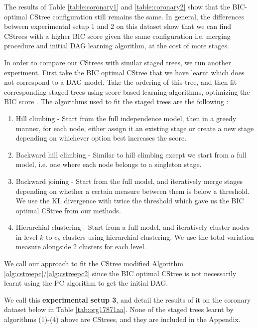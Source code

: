 \documentclass{tufte-book}
\begin{document}
The results of Table \ref{table:coronary1} and \ref{table:coronary2} show that the BIC-optimal CStree configuration still remains the same. In general, the differences between experimental setup 1 and 2 on this dataset show that we can find CStrees with a higher BIC score given the same configuration i.e. merging procedure and initial DAG learning algorithm, at the cost of more stages.




In order to compare our CStrees with similar staged trees, we run another experiment. First take the BIC optimal CStree that we have learnt which does not correspond to a DAG model. Take the ordering of this tree, and then fit corresponding staged trees using score-based learning algorithms, optimizing the BIC score \cite{carli-2020-r-packag}. The algorithms used to fit the staged trees are the following \cite{collazo-2018-chain}:


\begin{enumerate}
\item Hill climbing - Start from the full independence model, then in a greedy manner, for each node, either assign it an existing stage or create a new stage depending on whichever option best increases the score.
\item Backward hill climbing - Similar to hill climbing except we start from a full model, i.e. one where each node belongs to a singleton stage.
\item Backward joining - Start from the full model, and iteratively merge stages depending on whether a certain measure between them is below a threshold. We use the KL divergence with twice the threshold which gave us the BIC optimal CStree from our methods.
\item Hierarchial clustering - Start from a full model, and iteratively cluster nodes in level \(k\) to \(c_k\) clusters using hierarchial clustering. We use the total variation measure alongside 2 clusters for each level.
\end{enumerate}



We call our approach to fit the CStree modified Algorithm \ref{alg:cstreepc}/\ref{alg:cstreepc2} since the BIC optimal CStree is not necessarily learnt using the PC algorithm to get the initial DAG.

We call this \textbf{experimental setup 3}, and detail the results of it on the coronary dataset below in Table \ref{tab:org17871aa}. None of the staged trees learnt by algorithms (1)-(4) above are CStrees, and they are included in the Appendix.
\end{document}
